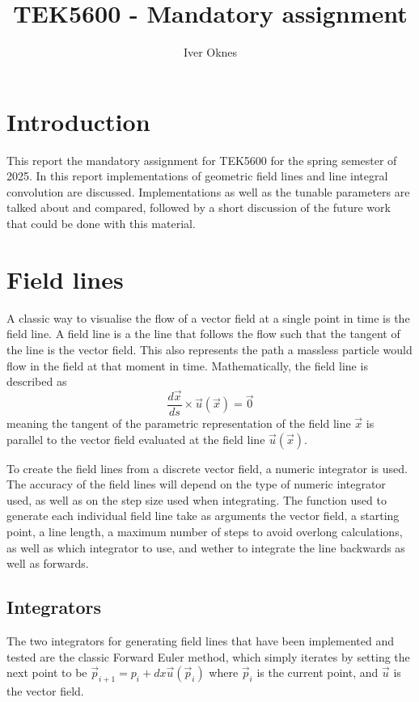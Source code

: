 \documentclass{article}
\title{TEK5600 - Mandatory assignment}
\author{Iver Oknes}
\begin{document}
\maketitle

\section{Introduction}
This report the mandatory assignment for TEK5600 for the spring semester of 2025.
In this report implementations of geometric field lines and line integral convolution
are discussed. Implementations as well as the tunable parameters are talked about
and compared, followed by a short discussion of the future work that could be done
with this material.

\section{Field lines}
A classic way to visualise the flow of a vector field at a single point in time is the field line.
A field line is a the line that follows the flow such that the tangent of the line is the vector field.
This also represents the path a massless particle would flow in the field at that moment in time.
Mathematically, the field line is described as
$$ \frac{d \vec{x}}{ds} \times \vec{u}(\vec{x}) = \vec{0} $$
meaning the tangent of the parametric representation of the field line $\vec{x}$ is parallel to the
vector field evaluated at the field line $\vec{u}(\vec{x})$.

To create the field lines from a discrete vector field, a numeric integrator is used. The accuracy
of the field lines will depend on the type of numeric integrator used, as well as on the step size
used when integrating. The function used to generate each individual field line take as arguments
the vector field, a starting point, a line length, a maximum number of steps to avoid overlong
calculations, as well as which integrator to use, and wether to integrate the line backwards as well
as forwards.

\subsection{Integrators}
The two integrators for generating field lines that have been implemented and tested are the classic
Forward Euler method, which simply iterates by setting the next point to be
$\vec{p}_{i+1} = p_i + dx \vec{u}(\vec{p}_i)$
where $\vec{p}_i$ is the current point, and $\vec{u}$ is the vector field.
\end{document}
